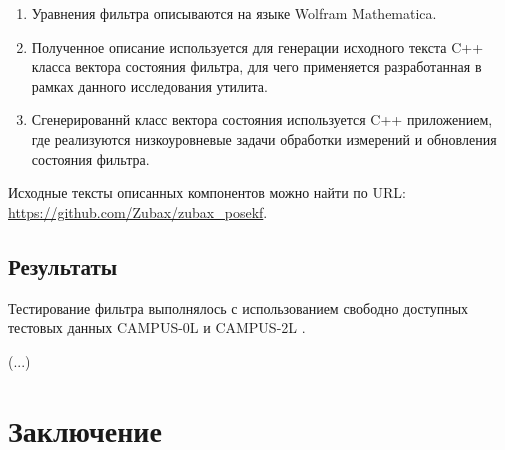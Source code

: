 \documentclass[11pt,a4paper]{article}
\begin{document}
\begin{enumerate}
    \item Уравнения фильтра описываются на языке Wolfram Mathematica.
    \item Полученное описание используется для генерации исходного текста C++ класса вектора состояния фильтра, для чего применяется разработанная в рамках данного исследования утилита.
    \item Сгенерированнй класс вектора состояния используется C++ приложением, где реализуются низкоуровневые задачи обработки измерений и обновления состояния фильтра.
\end{enumerate}

Исходные тексты описанных компонентов можно найти по URL: \url{https://github.com/Zubax/zubax_posekf}.

\subsection{Результаты}

Тестирование фильтра выполнялось с использованием свободно доступных тестовых данных CAMPUS-0L и CAMPUS-2L \cite{blanco2009cor}.

(...)

\section{Заключение}



\nocite{*}
\begin{fullwidth}
\printbibliography
\end{fullwidth}
\end{document}
